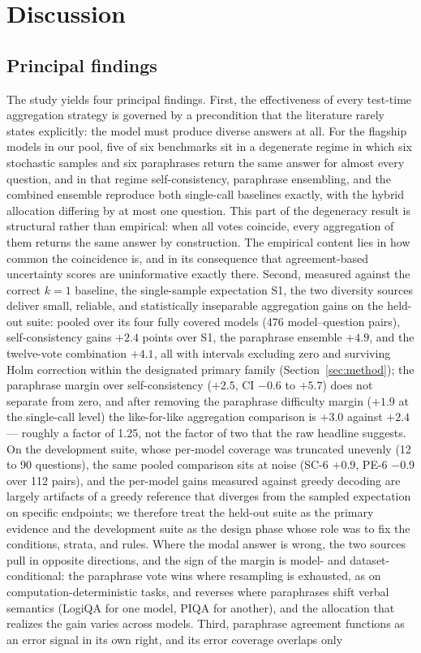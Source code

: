 \section{Discussion}
\label{sec:discussion}

\subsection{Principal findings}

The study yields four principal findings. First, the effectiveness of every test-time aggregation strategy is governed by a precondition that the literature rarely states explicitly: the model must produce diverse answers at all. For the flagship models in our pool, five of six benchmarks sit in a degenerate regime in which six stochastic samples and six paraphrases return the same answer for almost every question, and in that regime self-consistency, paraphrase ensembling, and the combined ensemble reproduce both single-call baselines exactly, with the hybrid allocation differing by at most one question. This part of the degeneracy result is structural rather than empirical: when all votes coincide, every aggregation of them returns the same answer by construction. The empirical content lies in how common the coincidence is, and in its consequence that agreement-based uncertainty scores are uninformative exactly there. Second, measured against the correct $k{=}1$ baseline, the single-sample expectation S1, the two diversity sources deliver small, reliable, and statistically inseparable aggregation gains on the held-out suite: pooled over its four fully covered models (476 model--question pairs), self-consistency gains $+2.4$ points over S1, the paraphrase ensemble $+4.9$, and the twelve-vote combination $+4.1$, all with intervals excluding zero and surviving Holm correction within the designated primary family (Section~\ref{sec:method}); the paraphrase margin over self-consistency ($+2.5$, CI $-$0.6 to $+5.7$) does not separate from zero, and after removing the paraphrase difficulty margin ($+1.9$ at the single-call level) the like-for-like aggregation comparison is $+3.0$ against $+2.4$ --- roughly a factor of 1.25, not the factor of two that the raw headline suggests. On the development suite, whose per-model coverage was truncated unevenly (12 to 90 questions), the same pooled comparison sits at noise (SC-6 $+0.9$, PE-6 $-$0.9 over 112 pairs), and the per-model gains measured against greedy decoding are largely artifacts of a greedy reference that diverges from the sampled expectation on specific endpoints; we therefore treat the held-out suite as the primary evidence and the development suite as the design phase whose role was to fix the conditions, strata, and rules. Where the modal answer is wrong, the two sources pull in opposite directions, and the sign of the margin is model- and dataset-conditional: the paraphrase vote wins where resampling is exhausted, as on computation-deterministic tasks, and reverses where paraphrases shift verbal semantics (LogiQA for one model, PIQA for another), and the allocation that realizes the gain varies across models. Third, paraphrase agreement functions as an error signal in its own right, and its error coverage overlaps only 